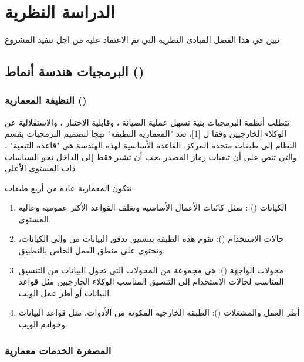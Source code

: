 \chapter{الدراسة النظرية}

\begin{chaptersummary}
نبين في هذا الفصل المبادئ النظرية التي تم الاعتماد عليه من اجل تنفيذ المشروع
\end{chaptersummary}

\section{البرمجيات هندسة أنماط ()}

\subsection{النظيفة المعمارية ()}
\label{subsec:clean-architecture}

تتطلب أنظمة البرمجيات بنية تسهل عملية الصيانة ، وقابلية الاختبار ، والاستقلالية عن الوكلاء الخارجيين  وفقا ل [1]، تعد "المعمارية النظيفة" نهجا لتصميم البرمجيات يقسم النظام إلى طبقات متحدة المركز. القاعدة الأساسية لهذه الهندسة هي "قاعدة التبعية" ، والتي تنص على أن تبعيات رماز المصدر يجب أن تشير فقط إلى الداخل نحو السياسات ذات المستوى الأعلى 

تتكون المعمارية عادة من أربع طبقات:

\begin{enumerate}
  \item الكيانات () : تمثل كائنات الأعمال الأساسية وتغلف القواعد الأكثر عمومية وعالية المستوى.
  \item حالات الاستخدام (): تقوم هذه الطبقة بتنسيق تدفق البيانات من وإلى الكيانات، وتحتوي على منطق العمل الخاص بالتطبيق.
  \item محولات الواجهة (): هي مجموعة من المحولات التي تحول البيانات من التنسيق المناسب لحالات الاستخدام إلى التنسيق المناسب الوكلاء الخارجيين مثل قواعد البيانات أو أطر عمل الويب.
  \item أطر العمل والمشغلات (): الطبقة الخارجية المكونة من الأدوات، مثل قواعد البيانات وخوادم الويب.
\end{enumerate}

\subsection{المصغرة الخدمات معمارية }

